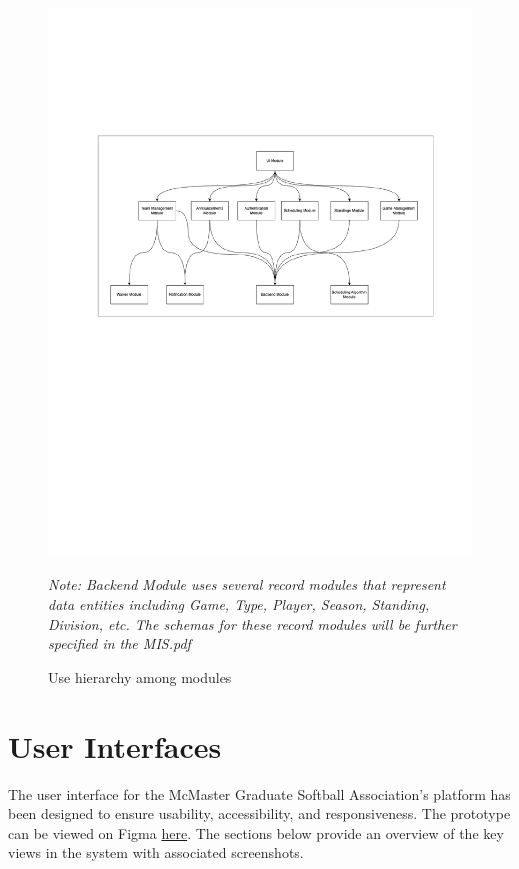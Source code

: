 \documentclass[12pt, titlepage]{article}
\begin{document}
\begin{figure}[H]
  \centering
  \includegraphics[scale=0.7]{module-decomp.pdf}
  \caption{Use hierarchy among modules}
  \textit{Note: Backend Module uses several record modules that represent data entities including Game, Type, Player, Season, Standing, Division, etc. The schemas for these record modules will be further specified in the MIS.pdf}
  \label{FigUH}
\end{figure}


\section{User Interfaces}

The user interface for the McMaster Graduate Softball Association's platform has been designed to ensure usability, accessibility, and responsiveness.
The prototype can be viewed on Figma \href{https://www.figma.com/proto/rm299NXqDphgHPHdfcNJfY/Softball-Capstone?node-id=17-409&p=f&t=5iRFT3K5cxIsTIDJ-1&scaling=min-zoom&content-scaling=fixed&page-id=0%3A1&starting-point-node-id=17%3A146&show-proto-sidebar=1}{here}.
The sections below provide an overview of the key views in the system with associated screenshots.
\end{document}
